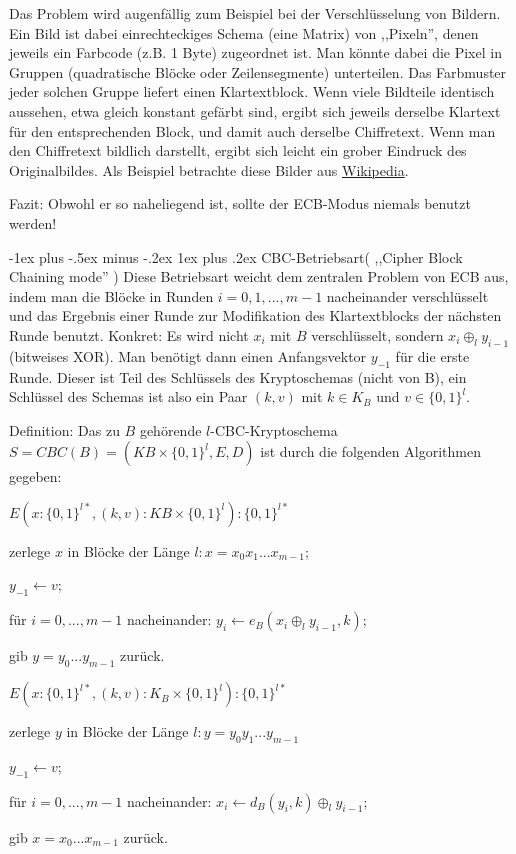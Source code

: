 \documentclass[a4paper]{article}
\makeatletter
\renewcommand{\subsubsection}{\@startsection{subsubsection}{3}{0mm}%
 {-1ex plus -.5ex minus -.2ex}%
 {1ex plus .2ex}%
 {\normalfont\small\bfseries}}
\makeatother
\begin{document}
\begin{multicols}{3}
    Das Problem wird augenfällig zum Beispiel bei der Verschlüsselung von Bildern. Ein Bild ist dabei einrechteckiges Schema (eine Matrix) von ,,Pixeln'', denen jeweils ein Farbcode (z.B. 1 Byte) zugeordnet ist. Man könnte dabei die Pixel in Gruppen (quadratische Blöcke oder Zeilensegmente) unterteilen. Das Farbmuster jeder solchen Gruppe liefert einen Klartextblock. Wenn viele Bildteile identisch aussehen, etwa gleich konstant gefärbt sind, ergibt sich jeweils derselbe Klartext für den entsprechenden Block, und damit auch derselbe Chiffretext. Wenn man den Chiffretext bildlich darstellt, ergibt sich leicht ein grober Eindruck des Originalbildes. Als Beispiel betrachte diese Bilder aus \href{https://de.wikipedia.org/wiki/Electronic_Code_Book_Mode}{Wikipedia}.

    Fazit: Obwohl er so naheliegend ist, sollte der ECB-Modus niemals benutzt werden!

    \subsubsection{CBC-Betriebsart( ,,Cipher Block Chaining mode'' )}
    Diese Betriebsart weicht dem zentralen Problem von ECB aus, indem man die Blöcke in Runden $i=0, 1 ,...,m-1$ nacheinander verschlüsselt und das Ergebnis einer Runde zur Modifikation des Klartextblocks der nächsten Runde benutzt. Konkret: Es wird nicht $x_i$ mit $B$ verschlüsselt, sondern $x_i\oplus_l y_{i-1}$ (bitweises XOR). Man benötigt dann einen Anfangsvektor $y_{-1}$ für die erste Runde. Dieser ist Teil des Schlüssels des Kryptoschemas (nicht von B), ein Schlüssel des Schemas ist also ein Paar $(k,v)$ mit $k\in K_B$ und $v\in\{0,1\}^l$.

    Definition: Das zu $B$ gehörende $l$-CBC-Kryptoschema $S=CBC(B)=(KB\times\{0,1\}^l,E,D)$ ist durch die folgenden Algorithmen gegeben:
    \begin{itemize*}
        \item $E(x:\{0,1\}^{l*},(k,v) :KB\times\{0,1\}^l) :\{0,1\}^{l*}$
        \item zerlege $x$ in Blöcke der Länge $l:x=x_0 x_1 ...x_{m-1}$;
        \item $y_{-1} \leftarrow v$;
        \item für $i= 0,...,m-1$ nacheinander: $y_i\leftarrow e_B(x_i\oplus_l y_{i-1},k)$;
        \item gib $y=y_0 ...y_{m-1}$ zurück.
        \item $E(x:\{0,1\}^{l*},(k,v) :K_B\times\{0,1\}^l) :\{0,1\}^{l*}$
        \item zerlege $y$ in Blöcke der Länge $l:y=y_0 y_1 ...y_{m-1}$
        \item $y_{-1} \leftarrow v$;
        \item für $i=0,...,m-1$ nacheinander: $x_i\leftarrow d_B(y_i,k)\oplus_l y_{i-1}$;
        \item gib $x=x_0 ...x_{m-1}$ zurück.
    \end{itemize*}


\end{multicols}
\end{document}
